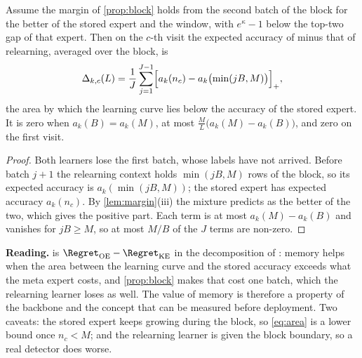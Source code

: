\begin{proposition}\label{prop:recall}
Assume the margin of \cref{prop:block} holds from the second batch of the block for the better of the stored expert
and the window, with $e^\kappa-1$ below the top-two gap of that expert. Then on the $c$-th visit the expected
accuracy of \method{} minus that of relearning, averaged over the block, is
\begin{equation}\label{eq:area}
  \Delta_{k,c}(L)=\frac1J\sum_{j=1}^{J-1}\Bigl[a_k(n_c)-a_k\bigl(\min(jB,M)\bigr)\Bigr]_+ ,
\end{equation}
the area by which the learning curve lies below the accuracy of the stored expert. It is zero when
$a_k(B)=a_k(M)$, at most $\tfrac{M}{L}\bigl(a_k(M)-a_k(B)\bigr)$, and zero on the first visit.
\end{proposition}
\begin{proof}
Both learners lose the first batch, whose labels have not arrived. Before batch $j+1$ the relearning context holds
$\min(jB,M)$ rows of the block, so its expected accuracy is $a_k(\min(jB,M))$; the stored expert has expected accuracy
$a_k(n_c)$. By \cref{lem:margin}(iii) the mixture predicts as the better of the two, which gives the positive part.
Each term is at most $a_k(M)-a_k(B)$ and vanishes for $jB\ge M$, so at most $M/B$ of the $J$ terms are non-zero.
\end{proof}

\textbf{Reading.}  is $\Regret_{\mathrm{OE}}-\Regret_{\mathrm{KE}}$ in the decomposition of
\citet{zhao2025mooe}: memory helps when the area between the learning curve and the stored accuracy exceeds what the
meta expert costs, and \cref{prop:block} makes that cost one batch, which the relearning learner loses as well. The
value of memory is therefore a property of the backbone and the concept that can be measured before deployment. Two
caveats: the stored expert keeps growing during the block, so \eqref{eq:area} is a lower bound once $n_c<M$; and the
relearning learner is given the block boundary, so a real detector does worse.
